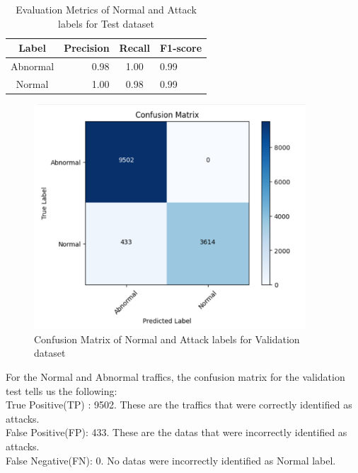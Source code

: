 \begin{table}[tbh]
	\centering
	\begin{tabular}{|c|r|c|l|} %
		\hline %
		Label  &Precision &Recall &F1-score \\
		\hline %
		Abnormal &0.98 &1.00 &0.99 \\
		\hline %
		Normal &1.00 &0.98 &0.99\\
		\hline
	\end{tabular}
	\caption{Evaluation Metrics of Normal and Attack labels for Test dataset}
	\label{Evaluation Metrics of Normal and Attack labels for test dataset}
\end{table}
 \begin{figure}[tbh] %
 	\begin{center}
 		\includegraphics[width=4in]{images/confMatnormvatt.png} 
 		\caption{Confusion Matrix of Normal and Attack labels for Validation dataset} %
 		\label{Confusion Matrix of Normal and Attack labels for Validation dataset} 
 	\end{center}
 \end{figure}
For the Normal and Abnormal traffics, the confusion matrix for the validation test tells us the following:\\ 
True Positive(TP) : 9502. These are the traffics that were correctly identified as attacks.\\
False Positive(FP): 433. These are the datas that were incorrectly identified as attacks.\\
False Negative(FN): 0. No datas were incorrectly identified as Normal label.\\
